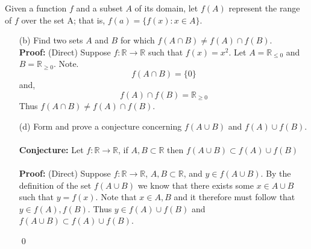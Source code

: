 \documentclass[12pt]{article}
\makeatletter
\theoremstyle{homework}
\newenvironment{exercise}[1]
{\def\@currentlabel{#1}\exercisecore}
{\endexercisecore}
\newcommand{\Reals}{\ensuremath{\mathbb R}}
\let\RR\Reals
\makeatother
\begin{document}
\begin{exercise}{1.2.7(b), (d)}
Given a function $f$ and a subset $A$ of its domain, let $f(A)$ represent the range of $f$ over the set A;
that is, $f(a)=\{f(x):x\in A\}$.
\end{exercise}
\begin{enumerate}
\item[(b)] Find two sets $A$ and $B$ for which $f(A\cap B) \neq f(A)\cap f(B)$.
\\
\textbf{Proof:} (Direct) Suppose $f: \RR \to \RR$ such that $f(x) = x^2$. Let $A = \RR_{\leq 0}$ and $B = \RR_{\geq 0}$. Note.
\begin{equation*}
  f(A \cap B) = \{0\}
\end{equation*}
 and,
 \begin{equation*}
  f(A)\cap f(B) =  \RR_{\geq 0}
 \end{equation*}
 Thus  $f(A\cap B) \neq f(A)\cap f(B)$.

\item[(d)] Form and prove a conjecture concerning $f(A\cup B)$ and $f(A)\cup f(B)$.\\\\
 
\textbf{Conjecture:} Let $f: \RR \to \RR$, if $A,B \subset \RR$ then $f(A\cup B) \subset f(A)\cup f(B)$\\\\
\textbf{Proof:} (Direct)  Suppose  $f: \RR \to \RR$, $A,B \subset \RR$, and $y \in f(A\cup B)$. By the definition of the set $f(A\cup B)$
we know that there exists some $x \in A\cup B$ such that $y = f(x)$. Note that $x \in A,B$ and it therefore must follow that $y \in f(A),f(B)$.
Thus $y \in  f(A)\cup f(B) $ and $f(A\cup B) \subset f(A)\cup f(B)$.

\qed
\end{enumerate}
\vspace{1in}
\end{document}
